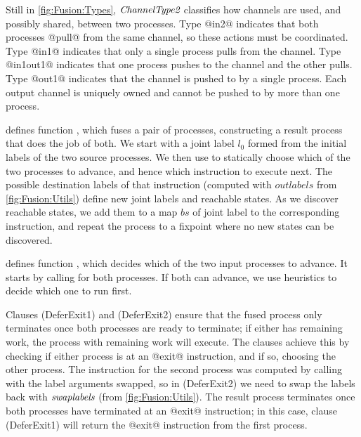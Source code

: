 Still in \cref{fig:Fusion:Types}, $\textit{ChannelType2}$ classifies how channels are used, and possibly shared, between two processes.
Type @in2@ indicates that both processes @pull@ from the same channel, so these actions must be coordinated.
Type @in1@ indicates that only a single process pulls from the channel.
Type @in1out1@ indicates that one process pushes to the channel and the other pulls.
Type @out1@ indicates that the channel is pushed to by a single process.
Each output channel is uniquely owned and cannot be pushed to by more than one process.





\smallskip
 defines function , which fuses a pair of processes, constructing a result process that does the job of both. We start with a joint label $l_0$ formed from the initial labels of the two source processes. We then use  to statically choose which of the two processes to advance, and hence which instruction to execute next. The possible destination labels of that instruction (computed with $outlabels$ from \cref{fig:Fusion:Utils}) define new joint labels and reachable states. As we discover reachable states, we add them to a map $bs$ of joint label to the corresponding instruction, and repeat the process to a fixpoint where no new states can be discovered.



 defines function , which decides which of the two input processes to advance. It starts by calling  for both processes. If both can advance, we use heuristics to decide which one to run first.

Clauses (DeferExit1) and (DeferExit2) ensure that the fused process only terminates once both processes are ready to terminate; if either has remaining work, the process with remaining work will execute.
The clauses achieve this by checking if either process is at an @exit@ instruction, and if so, choosing the other process.
The instruction for the second process was computed by calling  with the label arguments swapped, so in (DeferExit2) we need to swap the labels back with $\textit{swaplabels}$ (from \cref{fig:Fusion:Utils}).
The result process terminates once both processes have terminated at an @exit@ instruction; in this case, clause (DeferExit1) will return the @exit@ instruction from the first process.

